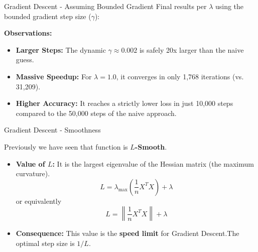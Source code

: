 \documentclass[10pt]{beamer}
\begin{document}
\begin{frame}{Gradient Descent - Assuming Bounded Gradient}
    \small
    Final results per $\lambda$ using the bounded gradient step size ($\gamma$):

    \vspace{0.4cm}
    \begin{table}[]
        \centering
    \end{table}

    \vspace{0.4cm}
    \textbf{Observations:}
   \begin{itemize}
        \item \textbf{Larger Steps:} The dynamic $\gamma \approx 0.002$ is safely 20x larger than the naive guess.
        \item \textbf{Massive Speedup:} For $\lambda = 1.0$, it converges in only 1,768 iterations (vs. 31,209).
        \item \textbf{Higher Accuracy:} It reaches a strictly lower loss in just 10,000 steps compared to the 50,000 steps of the naive approach.
    \end{itemize}
\end{frame}

\begin{frame}{Gradient Descent - Smoothness}

    Previously we have seen that function is \textbf{$L$-Smooth}.

    \vspace{0.3cm}
    \begin{itemize}
        \item \textbf{Value of $L$:} It is the largest eigenvalue of the Hessian matrix (the maximum curvature).
          $$L = \lambda_{\max}\left(\frac{1}{n}X^T X\right) + \lambda$$
          or equivalently
          $$L = \left\| \frac{1}{n}X^T X \right\| + \lambda$$
          
        \vspace{0.2cm}
        \item \textbf{Consequence:} This value is the \textbf{speed limit} for Gradient Descent.The optimal step size is $1/L$.
    \end{itemize}
\end{frame}
\end{document}

